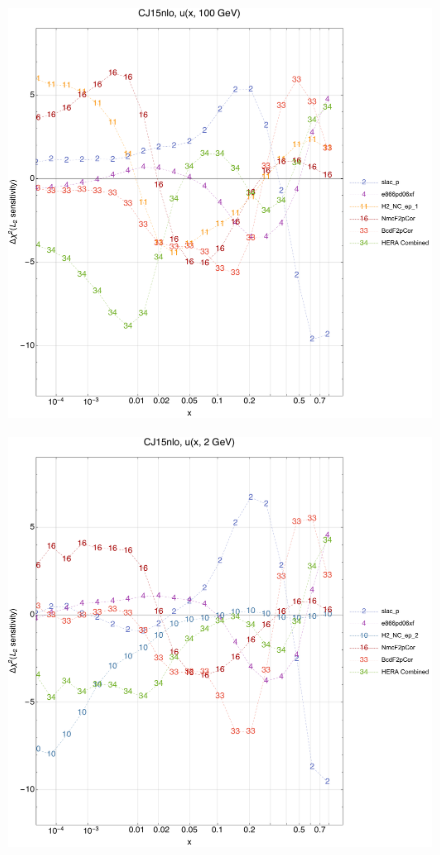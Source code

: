 \documentclass[10pt,aps,prd,floatfix,titlepage]{revtex4}
\begin{document}
\clearpage
\begin{figure}
\includegraphics[width=\textwidth,height=0.44\textheight,keepaspectratio]{1/ifl2_CJ15nlo_L2_q100_Sf_1.pdf}
\caption{}
\end{figure}
\begin{figure}
\includegraphics[width=\textwidth,height=0.44\textheight,keepaspectratio]{1/ifl2_CJ15nlo_L2_q2_Sf_1.pdf}
\caption{}
\end{figure}
\end{document}
